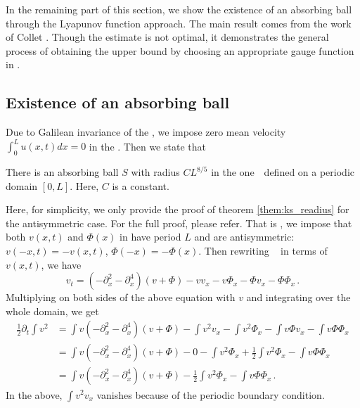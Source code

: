 In the remaining part of this section, we show the existence of an absorbing
ball through the Lyapunov function approach. The main result comes from
the work of Collet \etal{}. Though the estimate is not
optimal, it demonstrates the general process of obtaining the upper bound
by choosing an appropriate gauge function in .

\subsection{Existence of an absorbing ball}

Due to Galilean invariance of the \KSe, we impose zero mean velocity
$\int_0^L u(x,t)dx = 0$ in the \statesp. Then we state that
\begin{theorem}
  There is an absorbing ball $S$ with radius
  $C L^{8/5}$ in the one\dmn\ \KSe\ defined on a periodic domain
  $[0, L]$. Here, $C$ is a constant.
  \label{them:ks_readius}
\end{theorem}
Here, for simplicity, we only provide the proof of
theorem \ref{them:ks_readius} for the antisymmetric case.
For the full proof, please refer.
That is , we impose that both $v(x,t)$ and $\Phi(x)$ in 
have period $L$ and are antisymmetric:
$v(-x, t) = -v(x, t)$, $\Phi(-x) = -\Phi(x)$.
Then rewriting \KSe\  in terms of $v(x,t)$, we have
\[
  v_t  = (-\partial_x^2 - \partial_x^4)(v+\Phi) - vv_x - v\Phi_x -\Phi v_x
  -\Phi \Phi_x
  \,.
\]
Multiplying on both sides of the above equation with $v$
and integrating over the whole domain,
we get
\begin{align}
  \frac{1}{2} \partial_t \int v^2
  & = \int v(-\partial_x^2 - \partial_x^4)(v+\Phi)
    - \int v^2v_x - \int  v^2\Phi_x - \int  v\Phi v_x - \int  v\Phi \Phi_x
    \nonumber \\
  & = \int v(-\partial_x^2 - \partial_x^4)(v+\Phi)
    - 0 - \int v^2\Phi_x + \frac{1}{2}\int v^2\Phi_x - \int v\Phi \Phi_x
    \nonumber \\
  & = \int v(-\partial_x^2 - \partial_x^4)(v+\Phi)
    - \frac{1}{2}\int v^2\Phi_x - \int v\Phi \Phi_x  \,.
    \label{eq:ks_v2}
\end{align}
In the above, $\int v^2 v_x$ vanishes because of the periodic boundary condition.
